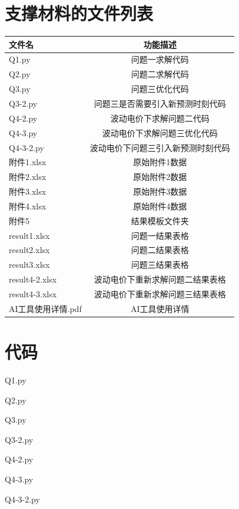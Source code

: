 \documentclass[withoutpreface,bwprint]{cumcmthesis}
\begin{document}
\begin{appendices}
\section{支撑材料的文件列表}
\begin{table}[H]
	\centering
	\setlength{\tabcolsep}{6pt}
	\renewcommand{\arraystretch}{1.5}
	\label{tab:支撑材料}
	\begin{tabular}{lc}
		\toprule
		\textbf{文件名} & \textbf{功能描述} \\
		\midrule
		\rowcolor{LightBlue}
		Q1.py & 问题一求解代码 \\
		Q2.py & 问题二求解代码 \\
		\rowcolor{LightBlue}
		Q3.py & 问题三优化代码 \\
		Q3-2.py & 问题三是否需要引入新预测时刻代码 \\
		\rowcolor{LightBlue}
		Q4-2.py & 波动电价下求解问题二代码 \\
		Q4-3.py & 波动电价下求解问题三优化代码 \\
		\rowcolor{LightBlue}
		Q4-3-2.py & 波动电价下问题三引入新预测时刻代码 \\
		附件1.xlsx & 原始附件1数据 \\
		\rowcolor{LightBlue}
		附件2.xlsx & 原始附件2数据 \\
		附件3.xlsx & 原始附件3数据 \\
		\rowcolor{LightBlue}
		附件4.xlsx & 原始附件4数据 \\
		附件5 & 结果模板文件夹 \\
		\rowcolor{LightBlue}
		result1.xlsx & 问题一结果表格 \\
		result2.xlsx & 问题二结果表格 \\
		\rowcolor{LightBlue}
		result3.xlsx & 问题三结果表格 \\
		result4-2.xlsx & 波动电价下重新求解问题二结果表格 \\
		\rowcolor{LightBlue}
		result4-3.xlsx & 波动电价下重新求解问题三结果表格 \\
		AI工具使用详情.pdf & AI工具使用详情 \\
		\bottomrule
	\end{tabular}
\end{table}

\section{代码}
\noindent Q1.py


\noindent Q2.py


\noindent Q3.py


\noindent Q3-2.py


\noindent Q4-2.py


\noindent Q4-3.py


\noindent Q4-3-2.py

\end{appendices}
\end{document}
